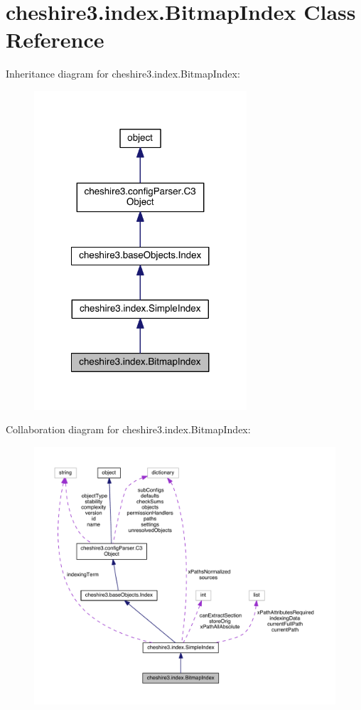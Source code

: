 \hypertarget{classcheshire3_1_1index_1_1_bitmap_index}{\section{cheshire3.\-index.\-Bitmap\-Index Class Reference}
\label{classcheshire3_1_1index_1_1_bitmap_index}
}


Inheritance diagram for cheshire3.\-index.\-Bitmap\-Index\-:
\nopagebreak
\begin{figure}[H]
\begin{center}
\leavevmode
\includegraphics[width=224pt]{classcheshire3_1_1index_1_1_bitmap_index__inherit__graph}
\end{center}
\end{figure}


Collaboration diagram for cheshire3.\-index.\-Bitmap\-Index\-:
\nopagebreak
\begin{figure}[H]
\begin{center}
\leavevmode
\includegraphics[width=350pt]{classcheshire3_1_1index_1_1_bitmap_index__coll__graph}
\end{center}
\end{figure}

